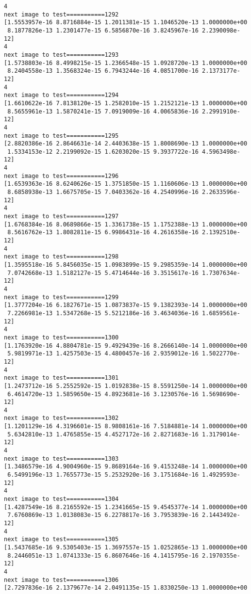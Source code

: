 \documentclass[11pt]{article}
\begin{document}
\begin{Verbatim}[commandchars=\\\{\}]
4
next image to test===========1292
[1.5553957e-16 8.8716884e-15 1.2011381e-15 1.1046520e-13 1.0000000e+00
 8.1877826e-13 1.2301477e-15 6.5856870e-16 3.8245967e-16 2.2390098e-12]
4
next image to test===========1293
[1.5738803e-16 8.4998215e-15 1.2366548e-15 1.0928720e-13 1.0000000e+00
 8.2404558e-13 1.3568324e-15 6.7943244e-16 4.0851700e-16 2.1373177e-12]
4
next image to test===========1294
[1.6610622e-16 7.8138120e-15 1.2582010e-15 1.2152121e-13 1.0000000e+00
 8.5655961e-13 1.5870241e-15 7.0919009e-16 4.0065836e-16 2.2991910e-12]
4
next image to test===========1295
[2.8820386e-16 2.8646631e-14 2.4403638e-15 1.8008690e-13 1.0000000e+00
 1.5334153e-12 2.2199092e-15 1.6203020e-15 9.3937722e-16 4.5963498e-12]
4
next image to test===========1296
[1.6539363e-16 8.6240626e-15 1.3751850e-15 1.1160606e-13 1.0000000e+00
 8.6858938e-13 1.6675705e-15 7.0403362e-16 4.2540996e-16 2.2633596e-12]
4
next image to test===========1297
[1.6768384e-16 8.0689866e-15 1.3361738e-15 1.1752388e-13 1.0000000e+00
 8.5616762e-13 1.8082811e-15 6.9986431e-16 4.2616358e-16 2.1392510e-12]
4
next image to test===========1298
[1.3595518e-16 5.8456035e-15 1.0983899e-15 9.2985359e-14 1.0000000e+00
 7.0742668e-13 1.5182127e-15 5.4714644e-16 3.3515617e-16 1.7307634e-12]
4
next image to test===========1299
[1.3777204e-16 6.1827671e-15 1.0873837e-15 9.1382393e-14 1.0000000e+00
 7.2266981e-13 1.5347268e-15 5.5212186e-16 3.4634036e-16 1.6859561e-12]
4
next image to test===========1300
[1.1763920e-16 4.8804781e-15 9.4929439e-16 8.2666140e-14 1.0000000e+00
 5.9819971e-13 1.4257503e-15 4.4800457e-16 2.9359012e-16 1.5022770e-12]
4
next image to test===========1301
[1.2473712e-16 5.2552592e-15 1.0192838e-15 8.5591250e-14 1.0000000e+00
 6.4614720e-13 1.5859650e-15 4.8923681e-16 3.1230576e-16 1.5698690e-12]
4
next image to test===========1302
[1.1201129e-16 4.3196601e-15 8.9808161e-16 7.5184881e-14 1.0000000e+00
 5.6342810e-13 1.4765855e-15 4.4527172e-16 2.8271683e-16 1.3179014e-12]
4
next image to test===========1303
[1.3486579e-16 4.9004960e-15 9.8689164e-16 9.4153248e-14 1.0000000e+00
 6.5499196e-13 1.7655773e-15 5.2532920e-16 3.1751684e-16 1.4929593e-12]
4
next image to test===========1304
[1.4287549e-16 8.2165592e-15 1.2341665e-15 9.4545377e-14 1.0000000e+00
 7.6760869e-13 1.0138083e-15 6.2278817e-16 3.7953839e-16 2.1443492e-12]
4
next image to test===========1305
[1.5437685e-16 9.5305403e-15 1.3697557e-15 1.0252865e-13 1.0000000e+00
 8.2446051e-13 1.0741333e-15 6.8607646e-16 4.1415795e-16 2.1970355e-12]
4
next image to test===========1306
[2.7297836e-16 2.1379677e-14 2.0491135e-15 1.8330250e-13 1.0000000e+00

\end{Verbatim}
\end{document}
